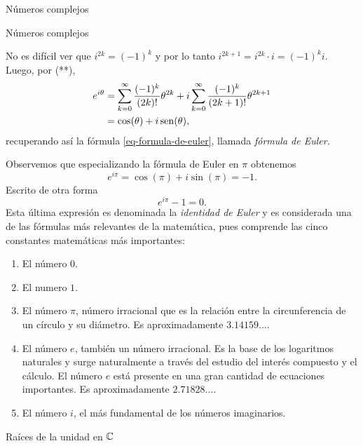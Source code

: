 \begin{chapter}{N\'umeros complejos}
\begin{section}{N\'umeros complejos}
\begin{observacion*}
      No es difícil ver que $i^{2k} = (-1)^k$ y por lo tanto $i^{2k+1} = i^{2k}\cdot i = (-1)^ki $. Luego, por (**),
      \begin{align*}
          e^{i\theta} & =  \sum_{k=0}^{\infty} \frac{(-1)^k}{(2k)!}\theta^{2k}  + i\sum_{k=0}^{\infty} \frac{ (-1)^k}{(2k+1)!}\theta^{2k+1} \\
                      & =\cos(\theta) + i \operatorname{sen}(\theta),
      \end{align*}
      recuperando así  la fórmula \eqref{eq-formula-de-euler}, llamada \emph{fórmula de Euler.}
  \end{observacion*}

  \begin{observacion*}  Observemos que especializando la fórmula de Euler en $\pi$ obtenemos
      \begin{equation*}
          e^{i\pi} = \cos(\pi) + i\sin(\pi) = -1.
      \end{equation*}
      Escrito de otra forma
      \begin{equation}
          e^{i\pi} -1 =0.
      \end{equation}
      Esta última expresión es denominada la \emph{identidad de Euler} y es considerada una de las fórmulas más relevantes de la matemática, pues comprende las cinco constantes matemáticas más importantes:
      \begin{enumerate}
          \item El número \boldmath${0}$.
          \item El numero \boldmath${1}$.
          \item El número \boldmath${\pi}$, número irracional  que es la relación entre la circunferencia de un círculo y su diámetro. Es aproximadamente $3.14159\ldots$.
          \item El número \boldmath${e}$, también un número irracional. Es la base de los logaritmos naturales y surge naturalmente a través del estudio del interés compuesto y el cálculo. El número $e$ está presente en una gran cantidad de ecuaciones importantes. Es aproximadamente $2.71828\ldots$.
          \item El número \boldmath$i$, el más fundamental de los números imaginarios.
      \end{enumerate}
  \end{observacion*}
 \end{section}

 \begin{section}{Raíces de la unidad en $\mathbb C$}


\end{section}
\end{chapter}
